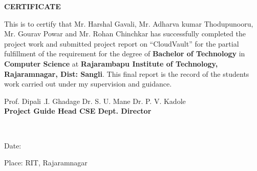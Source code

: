  \setcounter{page}{2}
\begin{center}
{\large{\bf{CERTIFICATE}}}
\end{center}
\doublespacing

\noindent This is to certify that Mr. Harshal Gavali, Mr. Adharva kumar
Thodupunooru, Mr. Gourav Powar and Mr. Rohan Chinchkar has successfully completed the project work and submitted project report on “CloudVault” for the partial fulfillment of the requirement for the degree of \textbf{Bachelor of Technology} in \textbf{Computer Science} at \textbf{Rajarambapu Institute of Technology, Rajaramnagar, Dist: Sangli}. This final report is the record of the students work carried out under my supervision and guidance.

\vspace{3cm}

\noindent Prof. Dipali .I. Ghadage  \hfill Dr. S. U. Mane \hfill  Dr. P. V. Kadole
\\
{\bf
\noindent Project Guide \hfill Head CSE Dept. \hfill  Director
}


\vspace{4cm}
\\

\vspace{2cm}


\noindent Date:

\noindent Place: RIT, Rajaramnagar
\clearpage